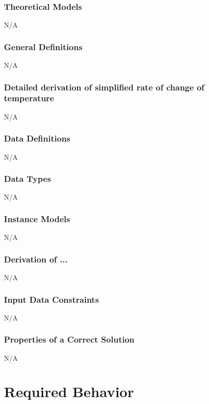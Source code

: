 \documentclass[12pt]{article}
\begin{document}
\subsubsection{Theoretical Models}\label{sec_theoretical}
N/A

\subsubsection{General Definitions}\label{sec_gendef}
N/A
\subsubsection*{Detailed derivation of simplified rate of change of temperature}
N/A

\subsubsection{Data Definitions}\label{sec_datadef}
N/A

\subsubsection{Data Types}\label{sec_datatypes}


N/A



\subsubsection{Instance Models} \label{sec_instance}
N/A

\subsubsection*{Derivation of ...}
N/A

\subsubsection{Input Data Constraints} \label{sec_DataConstraints}
N/A


\subsubsection{Properties of a Correct Solution} \label{sec_CorrectSolution}
N/A


\section{Required Behavior}
\end{document}
